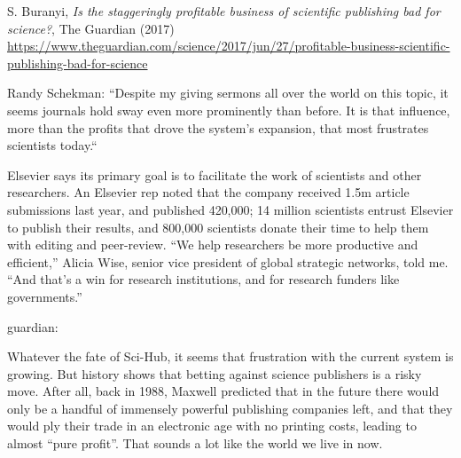 \documentclass[10pt,compress,serif,aspectratio=169]{beamer}
\begin{document}
\begin{frame}[t]%
 \vskip1cm%

S. Buranyi, \textit{Is the staggeringly profitable business of scientific publishing bad for science?}, The Guardian (2017)\\
{\tiny \url{https://www.theguardian.com/science/2017/jun/27/profitable-business-scientific-publishing-bad-for-science}}



Randy Schekman: “Despite my giving sermons all over the world on this topic, it seems journals hold sway even more prominently than before. It is that influence, more than the profits that drove the system’s expansion, that most frustrates scientists today.“

 Elsevier says its primary goal is to facilitate the work of scientists and other researchers. An Elsevier rep noted that the company received 1.5m article submissions last year, and published 420,000; 14 million scientists entrust Elsevier to publish their results, and 800,000 scientists donate their time to help them with editing and peer-review. “We help researchers be more productive and efficient,” Alicia Wise, senior vice president of global strategic networks, told me. “And that’s a win for research institutions, and for research funders like governments.”


 guardian:

 Whatever the fate of Sci-Hub, it seems that frustration with the current system is growing. But history shows that betting against science publishers is a risky move. After all, back in 1988, Maxwell predicted that in the future there would only be a handful of immensely powerful publishing companies left, and that they would ply their trade in an electronic age with no printing costs, leading to almost “pure profit”. That sounds a lot like the world we live in now.
\end{frame}
\end{document}
